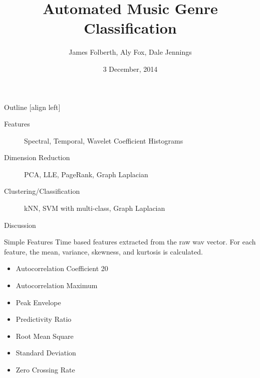 \documentclass[xcolor=dvipsnames,t]{beamer} %
\title{Automated Music Genre Classification}
\date{3 December, 2014}
\author{James Folberth, Aly Fox, Dale Jennings}
\begin{document}
\begin{frame}
\maketitle
\end{frame}


\begin{frame}{Outline}
   [align left] %
   \begin{description}                              %
      \item[Features] Spectral, Temporal, Wavelet Coefficient Histograms\\
      \item[Dimension Reduction] PCA, LLE, PageRank, Graph Laplacian\\
      \item[Clustering/Classification] kNN, SVM with multi-class, Graph Laplacian\\
      \item[Discussion]
   \end{description}

\end{frame}


\begin{frame}{Simple Features}
Time based features extracted from the raw wav vector.  For each feature, the mean, variance, skewness, and kurtosis is calculated.
\begin{itemize}
\item Autocorrelation Coefficient 20
\item Autocorrelation Maximum
\item Peak Envelope
\item Predictivity Ratio
\item Root Mean Square
\item Standard Deviation
\item Zero Crossing Rate
\end{itemize}
\end{frame}
\end{document}
